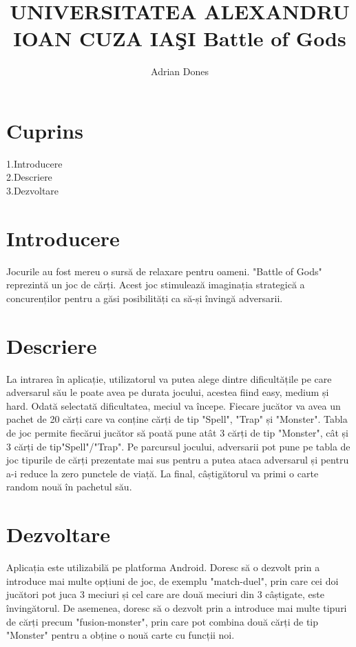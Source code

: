 \documentclass[a4paper]{article}
\title{UNIVERSITATEA ALEXANDRU IOAN CUZA IAŞI
          Battle of Gods
}
\author{Adrian Dones}
\begin{document}
\maketitle



\section{Cuprins}

1.Introducere\\
2.Descriere\\
3.Dezvoltare

\section{Introducere}
 Jocurile au fost mereu o sursă de relaxare pentru oameni. "Battle of Gods" reprezintă un joc de cărți. Acest joc stimulează imaginația strategică a concurenților pentru a găsi posibilități ca să-și învingă adversarii. 

\section{Descriere}
La intrarea în aplicație, utilizatorul va putea alege dintre dificultățile pe care adversarul său le poate avea pe durata jocului, acestea fiind easy, medium și hard. Odată selectată dificultatea, meciul va începe. Fiecare jucător va avea un pachet de 20 cărți care va conține cărți de tip "Spell", "Trap" și "Monster". Tabla de joc permite fiecărui jucător să poată pune atât 3 cărți de tip "Monster", cât și 3 cărți de tip"Spell"/"Trap".  
 Pe parcursul jocului, adversarii pot pune pe tabla de joc tipurile de cărți prezentate mai sus pentru a putea ataca adversarul și pentru a-i reduce la zero punctele de viață. La final, câștigătorul va primi o carte random nouă în pachetul său. 
\section{Dezvoltare}
 Aplicația este utilizabilă pe platforma Android. Doresc să o dezvolt prin a introduce mai multe opțiuni de joc, de exemplu "match-duel", prin care cei doi jucători pot juca 3 meciuri și cel care are două meciuri din 3 câștigate, este învingătorul. De asemenea, doresc să o dezvolt prin a introduce mai multe tipuri de cărți precum "fusion-monster", prin care pot combina două cărți de tip "Monster" pentru a obține o nouă carte cu funcții noi.
\end{document}

